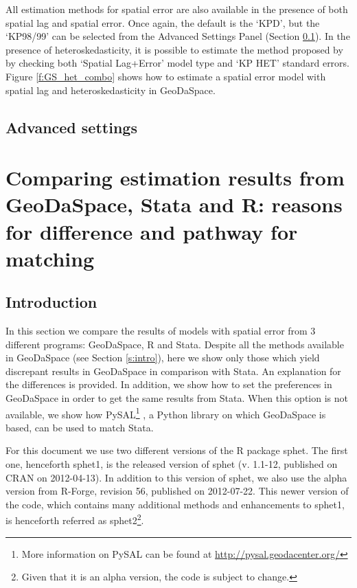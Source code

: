 \documentclass{article}
\begin{document}
All estimation methods for spatial error are also available in the presence of both spatial lag and spatial error. Once again, the default is the `KPD', but the `KP98/99' can be selected from the Advanced Settings Panel (Section \ref{s:adv}). In the presence of heteroskedasticity, it is possible to estimate the method proposed by \citet{Arraiz10} by checking both `Spatial Lag+Error' model type and `KP HET' standard errors. Figure \ref{f:GS_het_combo} shows how to estimate a spatial error model with spatial lag and heteroskedasticity in GeoDaSpace.


\subsection{Advanced settings}
\label{s:adv}




\newpage
\section{Comparing estimation results from GeoDaSpace, Stata and R: reasons for difference and pathway for matching}
\label{s:comparisons}

\subsection{Introduction}
In this section we compare the results of models with spatial error from 3 different programs: GeoDaSpace, R and Stata. Despite all the methods available in GeoDaSpace (see Section \ref{s:intro}), here we show only those which yield discrepant results in GeoDaSpace in comparison with Stata. An explanation for the differences is provided. In addition, we show how to set the preferences in GeoDaSpace in order to get the same results from Stata. When this option is not available, we show how PySAL\footnote{More information on PySAL can be found at \url{http://pysal.geodacenter.org/}} \citep{Rey07}, a Python library on which GeoDaSpace is based, can be used to match Stata.

For this document we use two different versions of the R package sphet. The first one, henceforth sphet1, is the released version of sphet (v. 1.1-12, published on CRAN on 2012-04-13). In addition to this version of sphet, we also use the alpha version from R-Forge, revision 56, published on 2012-07-22. This newer version of the code, which contains many additional methods and enhancements to sphet1, is henceforth referred as sphet2\footnote{Given that it is an alpha version, the code is subject to change.}.
\end{document}
